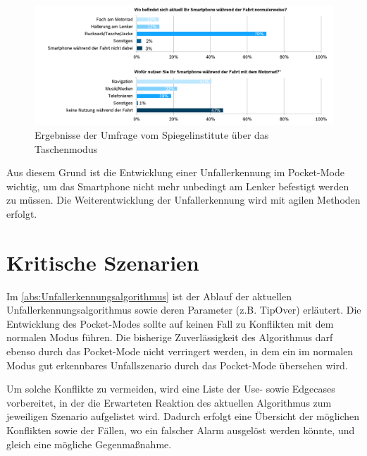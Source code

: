 

\begin{figure}
	\centering
	\includegraphics[width=\linewidth]{Bilder/SpiegelUmfragePocketMode.png}
	\caption{Ergebnisse der Umfrage vom Spiegelinstitute über das Taschenmodus}
	\label{fig:CalimotoUmfragePocketMode}
\end{figure}

Aus diesem Grund ist die Entwicklung einer Unfallerkennung im Pocket-Mode wichtig, um das Smartphone nicht mehr unbedingt am Lenker befestigt werden zu müssen. Die Weiterentwicklung der Unfallerkennung wird mit agilen Methoden erfolgt.

\section{Kritische Szenarien}
Im \autoref{abs:Unfallerkennungsalgorithmus} ist der Ablauf der aktuellen Unfallerkennungsalgorithmus sowie deren Parameter (z.B. TipOver) erläutert. Die Entwicklung des Pocket-Modes sollte auf keinen Fall zu Konflikten mit dem normalen Modus führen. Die bisherige Zuverlässigkeit des Algorithmus darf ebenso durch das Pocket-Mode nicht verringert werden, in dem ein im normalen Modus gut erkennbares Unfallszenario durch das Pocket-Mode übersehen wird.

Um solche Konflikte zu vermeiden, wird eine Liste der Use- sowie Edgecases vorbereitet, in der die Erwarteten Reaktion des aktuellen Algorithmus zum jeweiligen Szenario aufgelistet wird. Dadurch erfolgt eine Übersicht der möglichen Konflikten sowie der Fällen, wo ein falscher Alarm ausgelöst werden könnte, und gleich eine mögliche Gegenmaßnahme.

